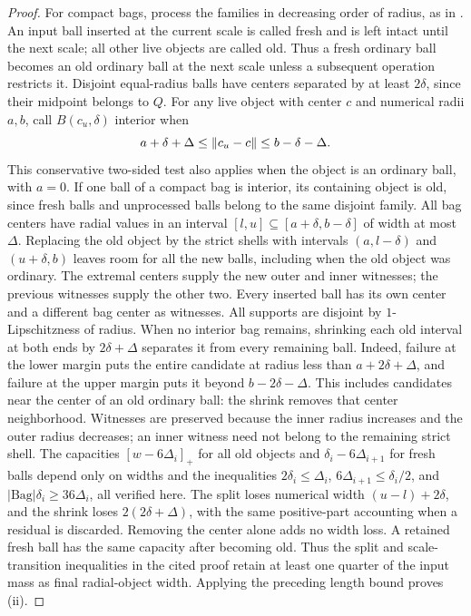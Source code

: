 \begin{proof}
For compact bags, process the families in decreasing order of radius,
as in \cite[Proposition B.8]{ThinTreesCompanion}.  An input ball inserted
at the current scale is called fresh and is left intact until the
next scale; all other live objects are called old.  Thus a fresh
ordinary ball becomes an old ordinary ball at the next scale unless
a subsequent operation restricts it.  Disjoint
equal-radius balls have centers separated by at least $2\delta$,
since their midpoint belongs to $Q$.  For any live object with center
$c$ and numerical radii $a,b$, call $B(c_u,\delta)$ interior when
\[
 a+\delta+\Delta\le\lVert c_u-c\rVert\le b-\delta-\Delta.
\]
This conservative two-sided test also applies when the object is
an ordinary ball, with $a=0$.  If one ball of a compact bag is
interior, its containing object is old, since fresh balls and
unprocessed balls belong to the same disjoint family.  All bag centers
have radial values in an interval $[l,u]\subseteq[a+\delta,b-\delta]$
of width at most $\Delta$.  Replacing the old object by the strict
shells with intervals $(a,l-\delta)$ and $(u+\delta,b)$ leaves room
for all the new balls, including when the old object was ordinary.
The extremal centers supply the new outer and inner witnesses;
the previous witnesses supply the other two.  Every inserted ball
has its own center and a different bag center as witnesses.
All supports are disjoint by $1$-Lipschitzness of radius.
When no interior bag remains, shrinking each old interval at both
ends by $2\delta+\Delta$ separates it from every remaining ball.
Indeed, failure at the lower margin puts the entire candidate at
radius less than $a+2\delta+\Delta$, and failure at the upper
margin puts it beyond $b-2\delta-\Delta$.  This includes candidates
near the center of an old ordinary ball: the shrink removes that
center neighborhood.  Witnesses are preserved because the inner
radius increases and the outer radius decreases; an inner witness
need not belong to the remaining strict shell.
The capacities $[w-6\Delta_i]_+$ for all old objects and
$\delta_i-6\Delta_{i+1}$ for fresh balls depend only on widths and
the inequalities $2\delta_i\le\Delta_i$,
$6\Delta_{i+1}\le\delta_i/2$, and
$|\mathrm{Bag}|\delta_i\ge36\Delta_i$, all verified here.
The split loses numerical width $(u-l)+2\delta$, and the shrink
loses $2(2\delta+\Delta)$, with the same positive-part accounting
when a residual is discarded.  Removing the center alone adds no
width loss.  A retained fresh ball has the same capacity after
becoming old.  Thus the split and scale-transition inequalities in
the cited proof retain at least one quarter of the input mass as
final radial-object width.
Applying the preceding length bound proves (ii).


\end{proof}
